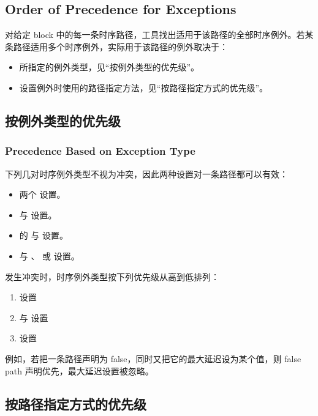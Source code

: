 \subsection*{Order of Precedence for Exceptions}

对给定 block 中的每一条时序路径，工具找出适用于该路径的全部时序例外。若某条路径适用多个时序例外，实际用于该路径的例外取决于：
\begin{itemize}
  \item 所指定的例外类型，见“按例外类型的优先级”。
  \item 设置例外时使用的路径指定方法，见“按路径指定方式的优先级”。
\end{itemize}

\subsection{按例外类型的优先级}
\subsubsection*{Precedence Based on Exception Type}

下列几对时序例外类型不视为冲突，因此两种设置对一条路径都可以有效：
\begin{itemize}
  \item 两个  设置。
  \item {} 与  设置。
  \item {} 的  与  设置。
  \item {} 与 、 或  设置。
\end{itemize}

发生冲突时，时序例外类型按下列优先级从高到低排列：
\begin{enumerate}
  \item {} 设置
  \item {} 与  设置
  \item {} 设置
\end{enumerate}

例如，若把一条路径声明为 false，同时又把它的最大延迟设为某个值，则 false path 声明优先，最大延迟设置被忽略。

\subsection{按路径指定方式的优先级}
